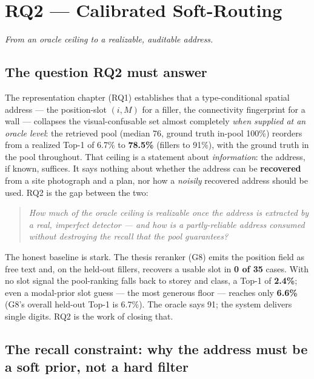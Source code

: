 \chapter{RQ2 --- Calibrated Soft-Routing}
\label{ch:rq2}

\emph{From an oracle ceiling to a realizable, auditable address.}

\section{The question RQ2 must answer}

The representation chapter (RQ1) establishes that a type-conditional spatial address --- the
position-slot $(i, M)$ for a filler, the connectivity fingerprint for a wall --- collapses the
visual-confusable set almost completely \emph{when supplied at an oracle level}: the retrieved pool
(median 76, ground truth in-pool 100\%) reorders from a realized Top-1 of 6.7\% to \textbf{78.5\%}
(fillers to 91\%), with the ground truth in the pool throughout. That ceiling is a statement about
\emph{information}: the address, if known, suffices. It says nothing about whether the address can be
\textbf{recovered} from a site photograph and a plan, nor how a \emph{noisily} recovered address
should be used. RQ2 is the gap between the two:

\begin{quote}
\emph{How much of the oracle ceiling is realizable once the address is extracted by a real, imperfect
detector --- and how is a partly-reliable address consumed without destroying the recall that the pool
guarantees?}
\end{quote}

The honest baseline is stark. The thesis reranker (G8) emits the position field as free text and, on
the held-out fillers, recovers a usable slot in \textbf{0 of 35} cases. With no slot signal the
pool-ranking falls back to storey and class, a Top-1 of \textbf{2.4\%}; even a modal-prior slot guess
--- the most generous floor --- reaches only \textbf{6.6\%} (G8's overall held-out Top-1 is 6.7\%).
The oracle says 91; the system delivers single digits. RQ2 is the work of closing that.

\section{The recall constraint: why the address must be a soft prior, not a hard filter}

